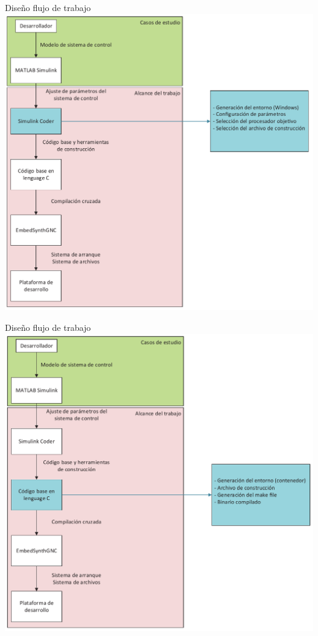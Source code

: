\documentclass[10pt,aspectratio=169]{beamer} %
\begin{document}
\begin{frame}{Diseño flujo de trabajo}
  \centering
  \includegraphics[scale=0.4]{Diagrama_general_del_proyecto/dgp_2.pdf}
\end{frame}

\begin{frame}{Diseño flujo de trabajo}
  \centering
  \includegraphics[scale=0.4]{Diagrama_general_del_proyecto/dgp_3.pdf}
\end{frame}
\end{document}
